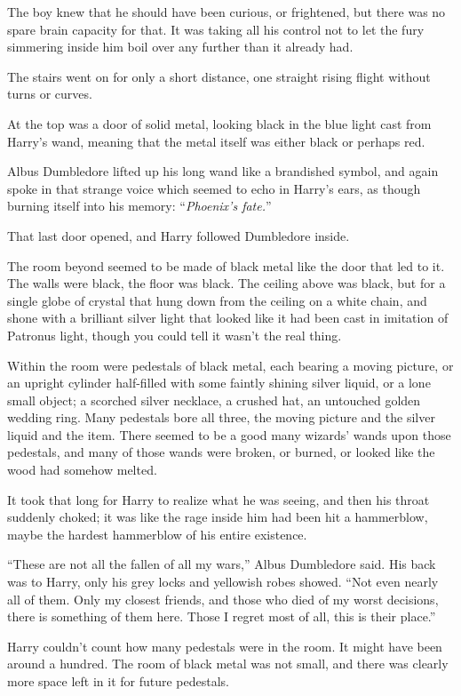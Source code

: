 The boy knew that he should have been curious, or frightened, but there was no
spare brain capacity for that. It was taking all his control not to let the
fury simmering inside him boil over any further than it already had.

The stairs went on for only a short distance, one straight rising flight
without turns or curves.

At the top was a door of solid metal, looking black in the blue light cast from
Harry’s wand, meaning that the metal itself was either black or perhaps red.

Albus Dumbledore lifted up his long wand like a brandished symbol, and again
spoke in that strange voice which seemed to echo in Harry’s ears, as though
burning itself into his memory: “\emph{Phoenix’s fate.}”

That last door opened, and Harry followed Dumbledore inside.

The room beyond seemed to be made of black metal like the door that led to it.
The walls were black, the floor was black. The ceiling above was black, but for
a single globe of crystal that hung down from the ceiling on a white chain, and
shone with a brilliant silver light that looked like it had been cast in
imitation of Patronus light, though you could tell it wasn’t the real thing.

Within the room were pedestals of black metal, each bearing a moving picture,
or an upright cylinder half-filled with some faintly shining silver liquid, or
a lone small object; a scorched silver necklace, a crushed hat, an untouched
golden wedding ring. Many pedestals bore all three, the moving picture and the
silver liquid and the item. There seemed to be a good many wizards’ wands upon
those pedestals, and many of those wands were broken, or burned, or looked like
the wood had somehow melted.

It took that long for Harry to realize what he was seeing, and then his throat
suddenly choked; it was like the rage inside him had been hit a hammerblow,
maybe the hardest hammerblow of his entire existence.

“These are not all the fallen of all my wars,” Albus Dumbledore said. His back
was to Harry, only his grey locks and yellowish robes showed. “Not even nearly
all of them. Only my closest friends, and those who died of my worst decisions,
there is something of them here. Those I regret most of all, this is their
place.”

Harry couldn’t count how many pedestals were in the room. It might have been
around a hundred. The room of black metal was not small, and there was clearly
more space left in it for future pedestals.

